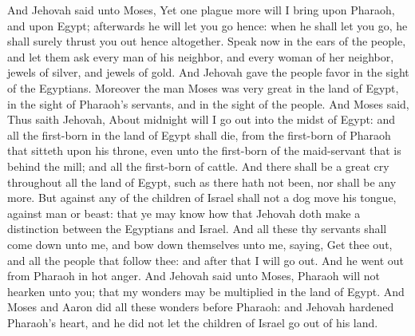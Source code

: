 And Jehovah said unto Moses, Yet one plague more will I bring upon Pharaoh, and upon Egypt; afterwards he will let you go hence: when he shall let you go, he shall surely thrust you out hence altogether. Speak now in the ears of the people, and let them ask every man of his neighbor, and every woman of her neighbor, jewels of silver, and jewels of gold. And Jehovah gave the people favor in the sight of the Egyptians. Moreover the man Moses was very great in the land of Egypt, in the sight of Pharaoh’s servants, and in the sight of the people.  And Moses said, Thus saith Jehovah, About midnight will I go out into the midst of Egypt: and all the first-born in the land of Egypt shall die, from the first-born of Pharaoh that sitteth upon his throne, even unto the first-born of the maid-servant that is behind the mill; and all the first-born of cattle. And there shall be a great cry throughout all the land of Egypt, such as there hath not been, nor shall be any more. But against any of the children of Israel shall not a dog move his tongue, against man or beast: that ye may know how that Jehovah doth make a distinction between the Egyptians and Israel. And all these thy servants shall come down unto me, and bow down themselves unto me, saying, Get thee out, and all the people that follow thee: and after that I will go out. And he went out from Pharaoh in hot anger.  And Jehovah said unto Moses, Pharaoh will not hearken unto you; that my wonders may be multiplied in the land of Egypt. And Moses and Aaron did all these wonders before Pharaoh: and Jehovah hardened Pharaoh’s heart, and he did not let the children of Israel go out of his land. 

